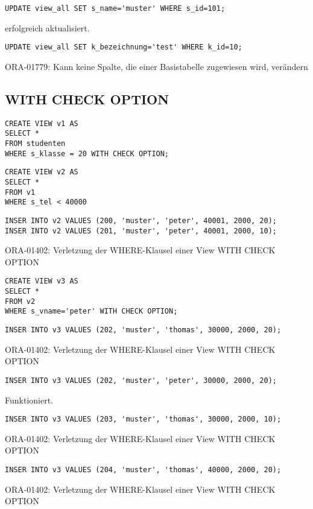 \documentclass[10pt]{scrreprt}
\begin{document}
\begin{lstlisting}[style=sql]
UPDATE view_all SET s_name='muster' WHERE s_id=101;
\end{lstlisting}
erfolgreich aktualisiert.

\begin{lstlisting}[style=sql]
UPDATE view_all SET k_bezeichnung='test' WHERE k_id=10;
\end{lstlisting}
ORA-01779: Kann keine Spalte, die einer Basistabelle zugewiesen wird, verändern

\subsection{WITH CHECK OPTION}
\begin{lstlisting}[style=sql]
CREATE VIEW v1 AS
SELECT *
FROM studenten
WHERE s_klasse = 20 WITH CHECK OPTION;
\end{lstlisting}

\begin{lstlisting}[style=sql]
CREATE VIEW v2 AS
SELECT *
FROM v1
WHERE s_tel < 40000
\end{lstlisting}

\begin{lstlisting}[style=sql]
INSER INTO v2 VALUES (200, 'muster', 'peter', 40001, 2000, 20);
INSER INTO v2 VALUES (201, 'muster', 'peter', 40001, 2000, 10);
\end{lstlisting}
ORA-01402: Verletzung der WHERE-Klausel einer View WITH CHECK OPTION

\begin{lstlisting}[style=sql]
CREATE VIEW v3 AS
SELECT *
FROM v2
WHERE s_vname='peter' WITH CHECK OPTION;
\end{lstlisting}

\begin{lstlisting}[style=sql]
INSER INTO v3 VALUES (202, 'muster', 'thomas', 30000, 2000, 20);
\end{lstlisting}
ORA-01402: Verletzung der WHERE-Klausel einer View WITH CHECK OPTION

\begin{lstlisting}[style=sql]
INSER INTO v3 VALUES (202, 'muster', 'peter', 30000, 2000, 20);
\end{lstlisting}
Funktioniert.

\begin{lstlisting}[style=sql]
INSER INTO v3 VALUES (203, 'muster', 'thomas', 30000, 2000, 10);
\end{lstlisting}
ORA-01402: Verletzung der WHERE-Klausel einer View WITH CHECK OPTION

\begin{lstlisting}[style=sql]
INSER INTO v3 VALUES (204, 'muster', 'thomas', 40000, 2000, 20);
\end{lstlisting}
ORA-01402: Verletzung der WHERE-Klausel einer View WITH CHECK OPTION
\end{document}
